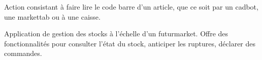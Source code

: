 Action consistant à faire lire le code barre d'un article, que ce soit par un cadbot, une markettab ou à une caisse.
\par

Application de gestion des stocks à l'échelle d'un futurmarket.
Offre des fonctionnalités pour consulter l'état du stock, anticiper les ruptures, déclarer des commandes.
\par
